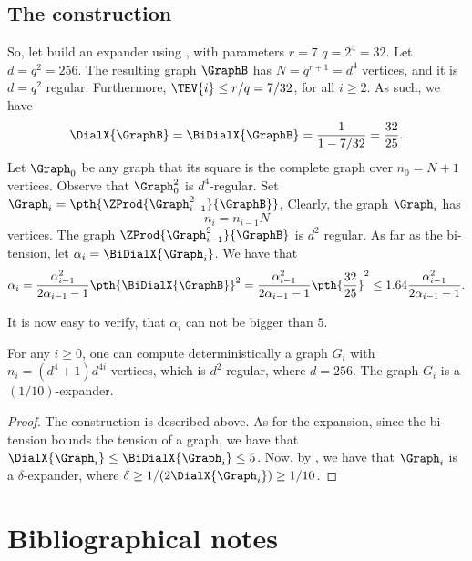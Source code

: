 \subsection{The construction}

So, let build an expander using , with parameters
$r=7$ $q=2^4=32$. Let $d= q^2 = 256$.  The resulting graph $\GraphB$
has $N=q^{r+1} = d^4$ vertices, and it is $d=q^2$
regular. Furthermore, $\TEV{i}\leq r/q= 7/32$, for all $i\geq 2$. As
such, we have
\[
\DialX{\GraphB}=
\BiDialX{\GraphB} = \frac{1}{1-7/32} = \frac{32}{25}.
\]
Let $\Graph_0$ be any graph that its square is the complete graph over
$n_0 = N+1$ vertices. Observe that $\Graph_0^2$ is $d^4$-regular. Set
$\Graph_i = \pth{\ZProd{\Graph_{i-1}^2}{\GraphB}}$, Clearly, the graph
$\Graph_i$ has
\[
n_i = n_{i-1} N
\]
vertices. The graph $\ZProd{\Graph_{i-1}^2}{\GraphB}$ is $d^2$
regular. As far as the bi-tension, let $\alpha_i =
\BiDialX{\Graph_i}$. We have that
\[
\alpha_i = 
\frac{\alpha_{i-1}^2}{2\alpha_{i-1} -1 }
\pth{\BiDialX{\GraphB}}^2
=
\frac{\alpha_{i-1}^2}{2\alpha_{i-1} -1 }
\pth{\frac{32}{25}}^2 \leq 
1.64 \frac{\alpha_{i-1}^2}{2\alpha_{i-1} -1 }.
\]

It is now easy to verify, that $\alpha_i$ can not be bigger than
$5$.

\begin{theorem}
    For any $i \geq 0$, one can compute deterministically a graph
    $G_i$ with $n_i = (d^4+1)d^{4i}$ vertices, which is $d^2$ regular,
    where $d=256$. The graph $G_i$ is a $(1/10)$-expander.
\end{theorem}

\begin{proof}
    The construction is described above. As for the expansion, since
    the bi-tension bounds the tension of a graph, we have that
    $\DialX{\Graph_i} \leq \BiDialX{\Graph_i} \leq 5$. Now, by
    , we have that $\Graph_i$ is a
    $\delta$-expander, where $\delta \geq 1/(2\DialX{\Graph_i}) \geq
    1/10$.
\end{proof}





\section{Bibliographical notes}



